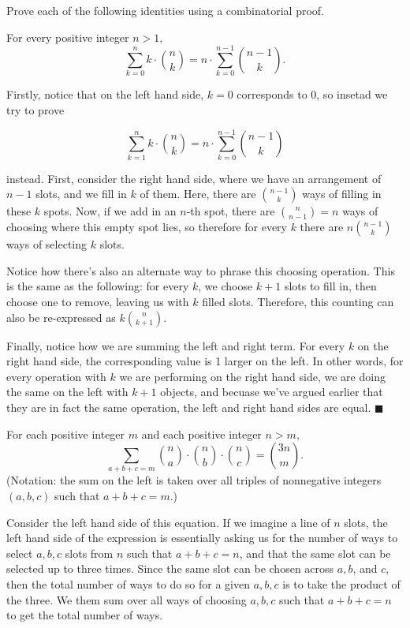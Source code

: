 \documentclass[11pt]{article}
\begin{document}
Prove each of the following identities using a combinatorial proof.

\begin{Parts}

\Part For every positive integer $n>1,$ 
\[\sum_{k=0}^n k \cdot \binom{n}{k} = n\cdot \sum_{k=0}^{n - 1}\binom{n - 1}{k}.\]

\begin{solution}
  Firstly, notice that on the left hand side, $k = 0$ corresponds to 0, so insetad we try to prove 

  \[ \sum_{k=1}^n k \cdot \binom{n}{k} = n\cdot \sum_{k=0}^{n - 1}\binom{n - 1}{k}\] 

  instead. First, consider the right hand side, where we have an arrangement of $n-1$ slots, and we fill in $k$ of them. Here, there are $n -1 \choose k$ ways of filling in these $k$ spots. Now, if we add in an $n$-th spot, there are ${n \choose n -1} = n$ ways of choosing where this empty spot lies, so therefore for every $k$ there are $n{n-1 \choose k}$ ways of selecting $k$ slots. 

  Notice how there's also an alternate way to phrase this choosing operation. This is the same as the following: for every $k$, we choose $k+1$ slots to fill in, then choose one to remove, leaving us with $k$ filled slots. Therefore, this counting can also be re-expressed as $k {n \choose k+1}$. 

  Finally, notice how we are summing the left and right term. For every $k$ on the right hand side, the corresponding value is 1 larger on the left. In other words, for every operation with $k$ we are performing on the right hand side, we are doing the same on the left with $k+1$ objects, and becuase we've argued earlier that they are in fact the same operation, the left and right hand sides are equal. $\blacksquare$
\end{solution}

\Part For each positive integer $m$ and each positive integer $n > m,$
\[\sum_{a + b + c = m} \binom{n}{a}\cdot\binom{n}{b}\cdot\binom{n}{c} = \binom{3n}{m}.\]
(Notation: the sum on the left is taken over all triples of nonnegative integers $(a,b,c)$ such that $a + b + c = m.$)

\begin{solution}
  Consider the left hand side of this equation. If we imagine a line of $n$ slots, the left hand side of the expression is essentially asking us for the number of ways to select $a, b, c$ slots from $n$ such that $a + b + c = n$, and that the same slot can be selected up to three times. Since the same slot can be chosen across $a, b$, and $c$, then the total number of ways to do so for a given $a, b, c$ is to take the product of the three. We them sum over all ways of choosing $a, b, c$ such that $a+b+c = n$ to get the total number of ways.


\end{solution}
\end{Parts}
\end{document}
